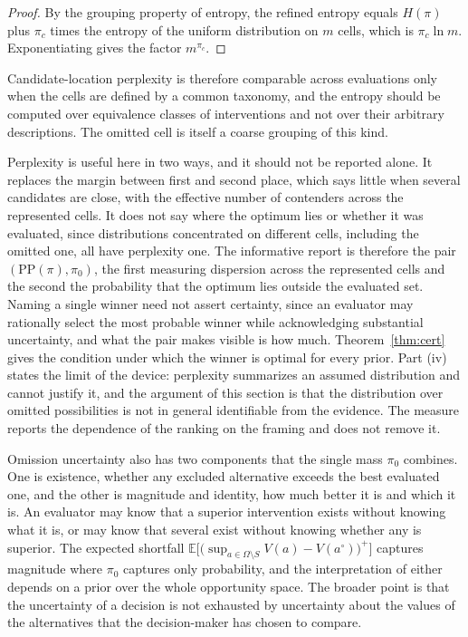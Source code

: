 \documentclass[11pt]{article}
\theoremstyle{definition}
\theoremstyle{remark}
\newcommand{\E}{\mathbb{E}}
\begin{document}
\begin{proof}
By the grouping property of entropy, the refined entropy equals $H(\pi)$ plus $\pi_c$ times the entropy of the uniform distribution on $m$ cells, which is $\pi_c\ln m$. Exponentiating gives the factor $m^{\pi_c}$.
\end{proof}

Candidate-location perplexity is therefore comparable across evaluations only when the cells are defined by a common taxonomy, and the entropy should be computed over equivalence classes of interventions and not over their arbitrary descriptions. The omitted cell is itself a coarse grouping of this kind.

Perplexity is useful here in two ways, and it should not be reported alone. It replaces the margin between first and second place, which says little when several candidates are close, with the effective number of contenders across the represented cells. It does not say where the optimum lies or whether it was evaluated, since distributions concentrated on different cells, including the omitted one, all have perplexity one. The informative report is therefore the pair $(\mathrm{PP}(\pi),\pi_0)$, the first measuring dispersion across the represented cells and the second the probability that the optimum lies outside the evaluated set. Naming a single winner need not assert certainty, since an evaluator may rationally select the most probable winner while acknowledging substantial uncertainty, and what the pair makes visible is how much. Theorem~\ref{thm:cert} gives the condition under which the winner is optimal for every prior. Part (iv) states the limit of the device: perplexity summarizes an assumed distribution and cannot justify it, and the argument of this section is that the distribution over omitted possibilities is not in general identifiable from the evidence. The measure reports the dependence of the ranking on the framing and does not remove it.

Omission uncertainty also has two components that the single mass $\pi_0$ combines. One is existence, whether any excluded alternative exceeds the best evaluated one, and the other is magnitude and identity, how much better it is and which it is. An evaluator may know that a superior intervention exists without knowing what it is, or may know that several exist without knowing whether any is superior. The expected shortfall $\E\big[\big(\sup_{a\in\Omega\setminus S}V(a)-V(a^{\circ})\big)^{+}\big]$ captures magnitude where $\pi_0$ captures only probability, and the interpretation of either depends on a prior over the whole opportunity space. The broader point is that the uncertainty of a decision is not exhausted by uncertainty about the values of the alternatives that the decision-maker has chosen to compare.
\end{document}

